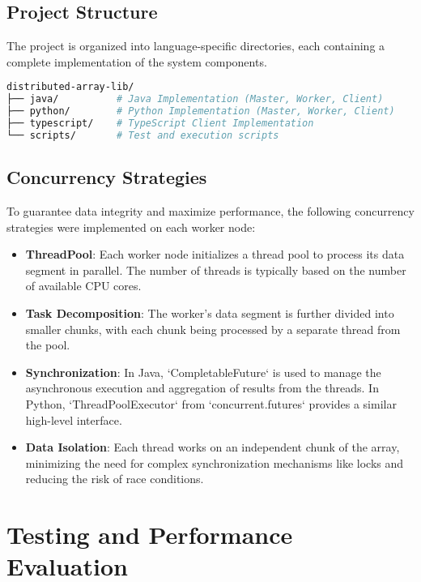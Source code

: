 \documentclass[10pt,a4paper]{article}
\theoremstyle{definition}
\theoremstyle{remark}
\begin{document}
\subsection{Project Structure}
The project is organized into language-specific directories, each containing a complete implementation of the system components.
\begin{lstlisting}[language=bash]
distributed-array-lib/
├── java/          # Java Implementation (Master, Worker, Client)
├── python/        # Python Implementation (Master, Worker, Client)
├── typescript/    # TypeScript Client Implementation
└── scripts/       # Test and execution scripts
\end{lstlisting}

\subsection{Concurrency Strategies}
To guarantee data integrity and maximize performance, the following concurrency strategies were implemented on each worker node:
\begin{itemize}
    \item \textbf{ThreadPool}: Each worker node initializes a thread pool to process its data segment in parallel. The number of threads is typically based on the number of available CPU cores.
    \item \textbf{Task Decomposition}: The worker's data segment is further divided into smaller chunks, with each chunk being processed by a separate thread from the pool.
    \item \textbf{Synchronization}: In Java, `CompletableFuture` is used to manage the asynchronous execution and aggregation of results from the threads. In Python, `ThreadPoolExecutor` from `concurrent.futures` provides a similar high-level interface.
    \item \textbf{Data Isolation}: Each thread works on an independent chunk of the array, minimizing the need for complex synchronization mechanisms like locks and reducing the risk of race conditions.
\end{itemize}

\section{Testing and Performance Evaluation}
\end{document}
